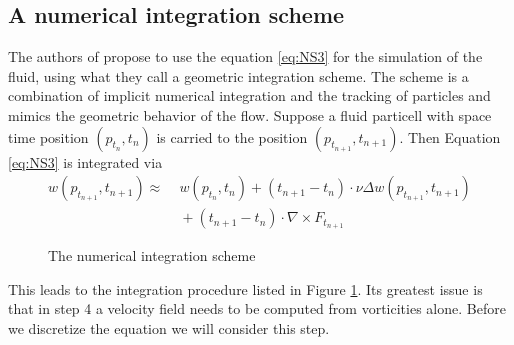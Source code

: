 \subsection{A numerical integration scheme}
The authors of  propose to use the equation \ref{eq:NS3} for the simulation of the fluid, using what they call a geometric integration scheme. The scheme is a combination of implicit numerical integration and the tracking of particles and mimics the geometric behavior of the flow. Suppose a fluid particell with space time position $(p_{t_n},t_n)$ is carried to the position $(p_{t_{n+1}},t_{n+1})$. Then Equation \ref{eq:NS3} is integrated via
\begin{align}w(p_{t_{n+1}},t_{n+1}) \approx \;& w(p_{t_n},t_n) + (t_{n+1}-t_n) \cdot \nu \Delta w(p_{t_{n+1}},t_{n+1}) \nonumber \\ &{}+ (t_{n+1}-t_n) \cdot\nabla \times F_{t_{n+1}}\label{eq:vortDiffusion}\end{align}


\begin{figure}[t]
\begin{center}\end{center}
\caption{The numerical integration scheme}
\label{fig:fd_numericalIntegration}
\end{figure}

This leads to the integration procedure listed in Figure \ref{fig:fd_numericalIntegration}. Its greatest issue is that in step 4 a velocity field needs to be computed from vorticities alone. Before we discretize the equation we will consider this step.


